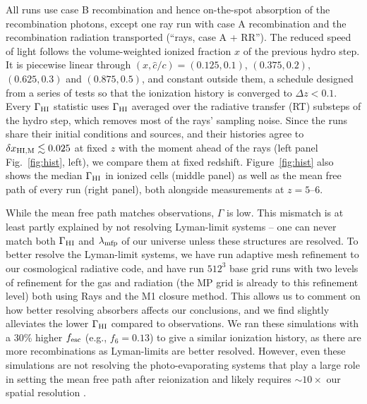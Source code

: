 \documentclass[iop]{openjournal}
\newcommand{\chat}{\hat{c}}
\begin{document}
All runs use case B recombination and hence on-the-spot absorption of the
recombination photons, except one ray run with case A recombination and
the recombination radiation transported (``rays, case A + RR''). %
The reduced speed of light follows the volume-weighted ionized fraction
$x$ of the previous hydro step. It is piecewise linear through
$(x,\chat/c)=(0.125,0.1)$, $(0.375,0.2)$, $(0.625,0.3)$ and $(0.875,0.5)$,
and constant outside them, a schedule designed from a series of tests so that the ionization history is converged to $\Delta z<0.1$.  Every $\Gamma_{\rm HI}$ statistic uses
$\Gamma_{\rm HI}$ averaged over the radiative transfer (RT) substeps of the hydro step, which
removes most of the rays' sampling noise. Since the runs share their
initial conditions and sources, and their histories agree to $\delta x_{\rm HI, M}\lesssim 0.025$ at fixed $z$ with the moment ahead of the rays (left panel Fig.~\ref{fig:hist}, left), we compare them at fixed redshift. Figure~\ref{fig:hist} also shows the median $\Gamma_{\rm HI}$ in ionized cells (middle panel) as well as the mean free path of every run (right panel), both alongside measurements at $z=5$--6.

While the mean free path matches observations, $\Gamma$ is low.  This mismatch is at least partly explained by not resolving Lyman-limit systems -- one can never match both $\Gamma_{\rm HI}$ and $\lambda_{\rm mfp}$ of our universe unless these structures are resolved.  To better resolve the Lyman-limit systems, we have run adaptive mesh refinement to our cosmological radiative code, and have run $512^3$ base grid runs with two levels of refinement for the gas and radiation (the MP grid is already to this refinement level) both using Rays and the M1 closure method.  This allows us to comment on how better resolving absorbers affects our conclusions, and we find slightly alleviates the lower $\Gamma_{\rm HI}$ compared to observations.  We ran these simulations with a 30\% higher $f_{\rm esc}$ (e.g., $f_6=0.13$) to give a similar ionization history, as there are more recombinations as Lyman-limits are better resolved. However, even these simulations are not resolving the photo-evaporating systems that play a large role in setting the mean free path after reionization and likely requires $\sim10\times$ our spatial resolution \citep{}.
\end{document}

